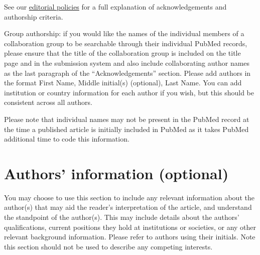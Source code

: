 \documentclass[a4paper,num-refs]{oup-contemporary}
\begin{document}
See our \href{https://academic.oup.com/gigascience/pages/editorial_policies_and_reporting_standards}{editorial policies} for a full explanation of acknowledgements and authorship criteria.

Group authorship: if you would like the names of the individual members of a collaboration group to be searchable through their individual PubMed records, please ensure that the title of the collaboration group is included on the title page and in the submission system and also include collaborating author names as the last paragraph of the “Acknowledgements” section. Please add authors in the format First Name, Middle initial(s) (optional), Last Name. You can add institution or country information for each author if you wish, but this should be consistent across all authors.

Please note that individual names may not be present in the PubMed record at the time a published article is initially included in PubMed as it takes PubMed additional time to code this information.

\section{Authors' information (optional)}

You may choose to use this section to include any relevant information about the author(s) that may aid the reader's interpretation of the article, and understand the standpoint of the author(s). This may include details about the authors' qualifications, current positions they hold at institutions or societies, or any other relevant background information. Please refer to authors using their initials. Note this section should not be used to describe any competing interests.




\end{document}
